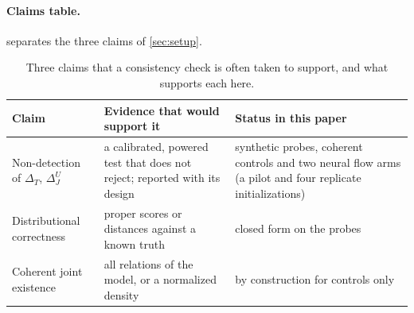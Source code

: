 \documentclass{article}
\theoremstyle{plain}
\theoremstyle{definition}
\theoremstyle{remark}
\begin{document}
\paragraph{Claims table.}
 separates the three claims of \cref{sec:setup}.
\begin{table}[h]
\centering
\caption{Three claims that a consistency check is often taken to support, and what supports each here.}
\label{tab:claims}
\scriptsize
\setlength{\tabcolsep}{3pt}
\begin{tabular}{p{}p{}p{}}
\toprule
Claim & Evidence that would support it & Status in this paper \\
\midrule
Non-detection of $\Delta_T$, $\Delta_J^U$ & a calibrated, powered test that does not reject; reported with its design & synthetic probes, coherent controls and two neural flow arms (a pilot and four replicate initializations) \\
Distributional correctness & proper scores or distances against a known truth & closed form on the probes \\
Coherent joint existence & all relations of the model, or a normalized density & by construction for controls only \\
\bottomrule
\end{tabular}
\end{table}
\end{document}
